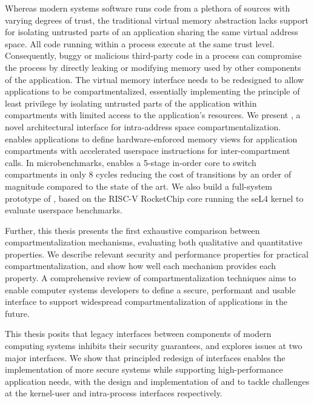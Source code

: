 Whereas modern systems software runs code from a plethora of sources with
varying degrees of trust, the traditional virtual memory abstraction lacks
support for isolating untrusted parts of an application sharing the same 
virtual address space.
All code running within a process execute at the same trust level.
Consequently, buggy or malicious third-party code in a process can compromise
the process by directly leaking or modifying memory used by other components 
of the application.
The virtual memory interface needs to be redesigned to allow applications to
be compartmentalized, essentially implementing the principle of least privilege
by isolating untrusted parts of the application within compartments with 
limited access to the application's resources.
We present \seccells, a novel architectural interface for intra-address space
compartmentalization.
\seccells enables applications to define hardware-enforced memory views for 
application compartments with 
accelerated userspace instructions for inter-compartment calls.
In microbenchmarks, \seccells enables a 5-stage in-order core to switch 
compartments in only 8 cycles reducing the cost of transitions by an order
of magnitude compared to the state of the art.
We also build a full-system prototype of \seccells, based on the RISC-V 
RocketChip core running the seL4 kernel to evaluate userspace benchmarks.

Further, this thesis presents the first exhaustive comparison between 
compartmentalization mechanisms, evaluating both qualitative and quantitative
properties.
We describe relevant security and performance properties for practical
compartmentalization, and show how well each mechanism provides each
property.
A comprehensive review of compartmentalization techniques aims to enable
computer systems developers to define a secure, performant and usable interface
to support widespread compartmentalization of applications in the future.

This thesis posits that legacy interfaces between components of modern
computing systems inhibits their security guarantees, and explores issues
at two major interfaces.
We show that principled redesign of interfaces enables the implementation of
more secure systems while supporting high-performance application needs,
with the design and implementation of \midas and \seccells to tackle challenges
at the kernel-user and intra-process interfaces respectively.

